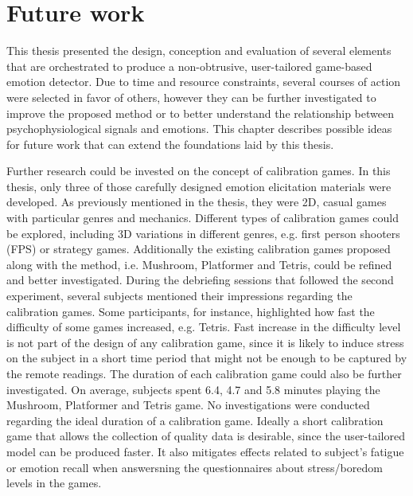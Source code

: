 \chapter{Future work}
\label{ch:closing}

This thesis presented the design, conception and evaluation of several elements that are orchestrated to produce a non-obtrusive, user-tailored game-based emotion detector. Due to time and resource constraints, several courses of action were selected in favor of others, however they can be further investigated to improve the proposed method or to better understand the relationship between psychophysiological signals and emotions. This chapter describes possible ideas for future work that can extend the foundations laid by this thesis.

Further research could be invested on the concept of calibration games. In this thesis, only three of those carefully designed emotion elicitation materials were developed. As previously mentioned in the thesis, they were 2D, casual games with particular genres and mechanics. Different types of calibration games could be explored, including 3D variations in different genres, e.g. first person shooters (FPS) or strategy games. Additionally the existing calibration games proposed along with the method, i.e. Mushroom, Platformer and Tetris, could be refined and better investigated. During the debriefing sessions that followed the second experiment, several subjects mentioned their impressions regarding the calibration games. Some participants, for instance, highlighted how fast the difficulty of some games increased, e.g. Tetris. Fast increase in the difficulty level is not part of the design of any calibration game, since it is likely to induce stress on the subject in a short time period that might not be enough to be captured by the remote readings. The duration of each calibration game could also be further investigated. On average, subjects spent 6.4, 4.7 and 5.8 minutes playing the Mushroom, Platformer and Tetris game. No investigations were conducted regarding the ideal duration of a calibration game. Ideally a short calibration game that allows the collection of quality data is desirable, since the user-tailored model can be produced faster. It also mitigates effects related to subject's fatigue or emotion recall when answersning the questionnaires about stress/boredom levels in the games.

